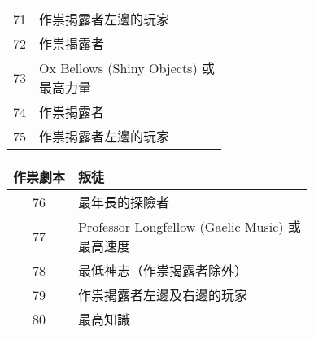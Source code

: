 \begin{center}
\begin{minipage}[t]{.45\textwidth}
\begin{tabular}[t]{ c l }
			71             & 作祟揭露者左邊的玩家                                 \\
			72             & 作祟揭露者                                      \\
			73             & \makecell[tl]{Ox Bellows (Shiny Objects) 或 \\ 最高力量 } \\
			74             & 作祟揭露者                                      \\
			75             & 作祟揭露者左邊的玩家                                 \\
		\end{tabular}
	\end{minipage}\hfil
	\begin{minipage}[t]{.45\textwidth}
		\renewcommand{\arraystretch}{1.5}
		\begin{tabular}[t]{ c l }
			\toprule
			\bfseries 作祟劇本 & \bfseries 叛徒                                                                                                                        \\[.5ex]
			\midrule
			76             & 最年長的探險者                                                                                                                             \\
			77             & \makecell[tl]{Professor Longfellow (Gaelic Music) 或                                                                                 \\ 最高速度 } \\
			78             & 最低神志（作祟揭露者除外）                                                                                                                       \\
			79             & 作祟揭露者左邊及右邊的玩家                                                                                                                       \\
			80             & 最高知識                                                                                                                                \\


\end{tabular}
\end{minipage}
\end{center}
